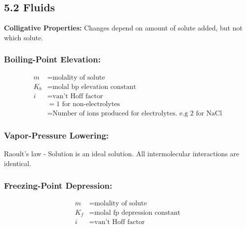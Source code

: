 \subsection{5.2 Fluids}
    \textbf{Colligative Properties: }Changes depend on amount of solute added, but not which solute.
    
    \subsubsection{Boiling-Point Elevation: }
        \vspace*{0.5em}
        \begin{align*}
            m & = \text{molality of solute}\\
            K_b & = \text{molal bp elevation constant}\\
            i & = \text{van't Hoff factor}\\
            & = 1 \text{ for non-electrolytes}\\
            & = \text{Number of ions produced for electrolytes. e.g 2 for NaCl}
        \end{align*}
    
    \subsubsection{Vapor-Pressure Lowering: }
        \vspace*{0.5em}
    
        Raoult's law - Solution is an ideal solution. All intermolecular interactions are identical. 
        \vspace*{0.5em}

    \subsubsection{Freezing-Point Depression: }
        \vspace*{0.5em}
        \begin{align*}
            m & = \text{molality of solute}\\
            K_f & = \text{molal fp depression constant}\\
            i & = \text{van't Hoff factor}\\
        \end{align*}